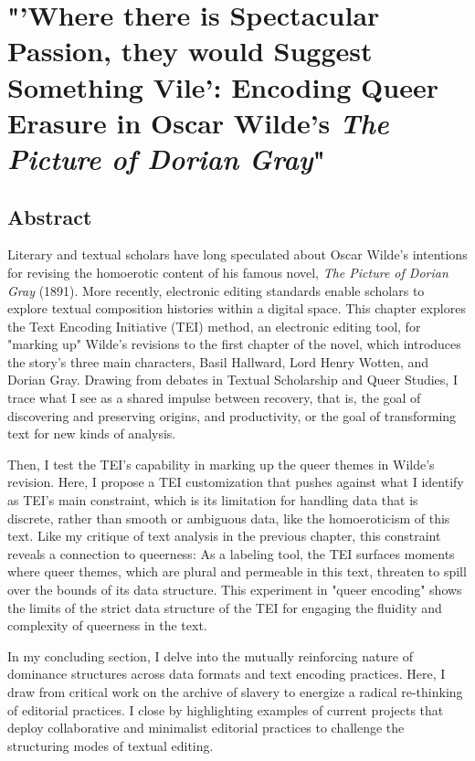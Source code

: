 \documentclass[11pt]{article}
\author{Filipa  Calado}
\date{\today}
\title{}
\begin{document}
\tableofcontents

\section{"'Where there is Spectacular Passion, they would Suggest Something Vile': Encoding Queer Erasure in Oscar Wilde’s \emph{The Picture of Dorian Gray}"}
\label{sec:org23d174a}

\subsection{Abstract}
\label{sec:org632f9a5}
Literary and textual scholars have long speculated about Oscar Wilde's
intentions for revising the homoerotic content of his famous novel,
\emph{The Picture of Dorian Gray} (1891). More recently, electronic editing
standards enable scholars to explore textual composition histories
within a digital space. This chapter explores the Text Encoding
Initiative (TEI) method, an electronic editing tool, for "marking up"
Wilde's revisions to the first chapter of the novel, which introduces
the story's three main characters, Basil Hallward, Lord Henry Wotten,
and Dorian Gray. Drawing from debates in Textual Scholarship and Queer
Studies, I trace what I see as a shared impulse between recovery, that
is, the goal of discovering and preserving origins, and productivity,
or the goal of transforming text for new kinds of analysis. 

Then, I test the TEI's capability in marking up the queer themes in
Wilde's revision. Here, I propose a TEI customization that pushes
against what I identify as TEI's main constraint, which is its
limitation for handling data that is discrete, rather than smooth or
ambiguous data, like the homoeroticism of this text. Like my critique
of text analysis in the previous chapter, this constraint reveals a
connection to queerness: As a labeling tool, the TEI surfaces moments
where queer themes, which are plural and permeable in this text,
threaten to spill over the bounds of its data structure. This
experiment in "queer encoding" shows the limits of the strict data
structure of the TEI for engaging the fluidity and complexity of
queerness in the text.

In my concluding section, I delve into the mutually reinforcing nature
of dominance structures across data formats and text encoding
practices. Here, I draw from critical work on the archive of slavery
to energize a radical re-thinking of editorial practices. I close by
highlighting examples of current projects that deploy collaborative
and minimalist editorial practices to challenge the structuring modes
of textual editing.
\end{document}
